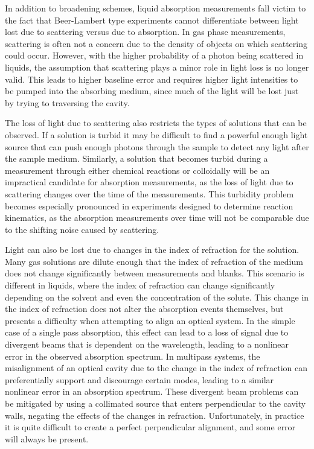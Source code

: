 In addition to broadening schemes, liquid absorption measurements fall victim
to the fact that Beer-Lambert type experiments cannot differentiate between
light lost due to scattering versus due to absorption.  In gas phase
measurements, scattering is often not a concern due to the density of objects
on which scattering could occur. However, with the higher probability of a
photon being scattered in liquids, the assumption that scattering plays a minor
role in light loss is no longer valid. This leads to higher baseline error and
requires higher light intensities to be pumped into the absorbing medium, since
much of the  light will be lost just by trying to traversing the cavity.

The loss of light due to scattering also restricts the types of solutions that
can be observed. If a solution is turbid it may be difficult to find a powerful
enough light source that can push enough photons through the sample to detect
any light after the sample medium. Similarly, a solution that becomes turbid
during a measurement through either chemical reactions or colloidally will be
an impractical candidate for absorption measurements, as the loss of light due
to scattering changes over the time of the measurements. This turbidity problem
becomes especially pronounced in experiments designed to determine reaction
kinematics, as the absorption measurements over time will not be comparable due
to the shifting noise caused by scattering.


Light can also be lost due to changes in the index of refraction for the
solution. Many gas solutions are dilute enough that the index of refraction of
the medium does not change significantly between measurements and blanks. This
scenario is different in liquids, where the index of refraction can change
significantly depending on the solvent and even the concentration of the
solute. This change in the index of refraction does not alter the absorption
events themselves, but presents a difficulty when attempting to align an
optical system. In the simple case of a single pass absorption, this effect can
lead to a loss of signal due to divergent beams that is dependent on the
wavelength, leading to a nonlinear error in the observed absorption spectrum.
In multipass systems, the misalignment of an optical cavity due to the change
in the index of refraction can preferentially support and discourage certain
modes, leading to a similar nonlinear error in an absorption spectrum. These
divergent beam problems can be mitigated by using a collimated source that
enters perpendicular to the cavity walls, negating the effects of the changes
in refraction. Unfortunately, in practice it is quite difficult to create a
perfect perpendicular alignment, and some error will always be present.

